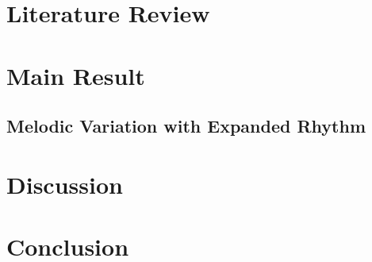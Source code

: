 \documentclass[11pt]{article}
\begin{document}
\section{Literature Review}
\label{sec: literaturereview}
\section{Main Result}
\label{sec: mainresult}
\subsection{Melodic Variation with Expanded Rhythm}
\label{subsec: melodicvariationwithexpandedrhythm}
\section{Discussion}
\label{sec: discussion}
\section{Conclusion}
\label{sec: conclusion}
\pagebreak
\end{document}
